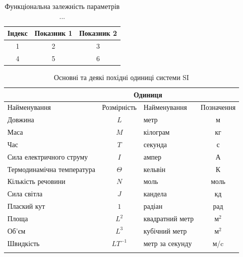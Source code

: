 \begin{table}[h]
\caption{\label{apdxtable:1}Функціональна залежність параметрів ...}
 \begin{tabular}{|c|c|c|}
 \hline 
 Індекс & Показник 1 & Показник 2\tabularnewline
 \hline\hline 
 1      & 2          & 3         \tabularnewline
 \hline
 4      & 5          & 6         \tabularnewline
 \hline 
\end{tabular}
\end{table}
  


\begin{table}[h]
\underonespace
\caption{\label{apdxtable:2}Основні та деякі похідні одиниці системи SI}
\begin{tabular}{|>{\raggedright}m{5cm}|c|m{4cm}|c|}
\hline
\multicolumn{2}{|c|}{Величина}&\multicolumn{2}{c|}{Одиниця}\\[0pt]\hline\vspace{4pt}
Найменування & Розмірність & Найменування & Позначення \\[0pt]\hline\hline\vspace{4pt}
Довжина & $L$ & метр & м \\[0pt]\hline\vspace{4pt}
Маса & $M$ & кілограм & кг \\[0pt]\hline\vspace{4pt}
Час & $T$ & секунда & с \\[0pt]\hline\vspace{4pt}
Сила електричного струму & $I$ & ампер & А \\[0pt]\hline\vspace{4pt}
Термодинамічна температура & $\Theta$ & кельвін & К \\[0pt]\hline\vspace{4pt}
Кількість речовини & $N$ & моль & моль \\[0pt]\hline\vspace{4pt}
Сила світла & $J$ & кандела & кд \\[0pt]\hline
\hline\vspace{4pt}
Плаский кут & $1$ & радіан & рад \\[0pt]\hline\vspace{4pt}
Площа & $L^2$ & квадратний метр & м$^2$ \\[0pt]\hline\vspace{4pt}
Об'єм & $L^3$ & кубічний метр & м$^2$\\[0pt]\hline\vspace{4pt}
Швидкість & $LT^{-1}$ & метр за секунду & м/c \\[0pt]\hline\vspace{4pt}

\end{tabular}
\end{table}
